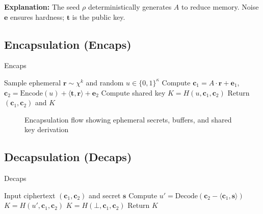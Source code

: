 \documentclass[conference]{IEEEtran}
\begin{document}
\textbf{Explanation:} The seed $\rho$ deterministically generates $A$ to reduce memory. Noise $\mathbf{e}$ ensures hardness; $\mathbf{t}$ is the public key.

\subsection{Encapsulation (Encaps)}
\begin{algorithm}[H]
\caption{Encaps}
\begin{algorithmic}[1]
\State Sample ephemeral $\mathbf{r} \sim \chi^k$ and random $u \in \{0,1\}^\kappa$
\State Compute $\mathbf{c}_1 = A \cdot \mathbf{r} + \mathbf{e}_1$, $\mathbf{c}_2 = \text{Encode}(u) + \langle \mathbf{t}, \mathbf{r} \rangle + \mathbf{e}_2$
\State Compute shared key $K = H(u, \mathbf{c}_1, \mathbf{c}_2)$
\State Return $(\mathbf{c}_1, \mathbf{c}_2)$ and $K$
\end{algorithmic}
\end{algorithm}

\begin{figure}[H]
\centering
{}
\caption{Encapsulation flow showing ephemeral secrets, buffers, and shared key derivation}
\end{figure}


\subsection{Decapsulation (Decaps)}
\begin{algorithm}[H]
\caption{Decaps}
\begin{algorithmic}[1]
\State Input ciphertext $(\mathbf{c}_1, \mathbf{c}_2)$ and secret $\mathbf{s}$
\State Compute $u' = \text{Decode}(\mathbf{c}_2 - \langle \mathbf{c}_1, \mathbf{s} \rangle)$
 $K = H(u', \mathbf{c}_1, \mathbf{c}_2)$
\Else $K = H(\bot, \mathbf{c}_1, \mathbf{c}_2)$
\EndIf
\State Return $K$
\end{algorithmic}
\end{algorithm}
\end{document}
